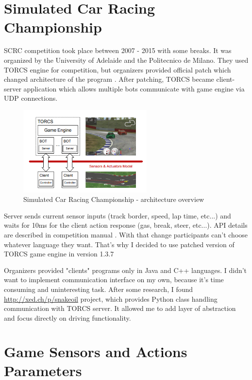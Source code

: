 \documentclass[declaration,shortabstract,english,inz]{iithesis}
\begin{document}
\section{Simulated Car Racing Championship}

SCRC competition took place between 2007 - 2015 with some breaks. It was organized by the University of Adelaide and the Politecnico de Milano.
They used TORCS engine for competition, but organizers provided official patch which changed architecture of the program \cite{SCRC}.
After patching, TORCS became client-server application which allows multiple bots communicate with game engine via UDP connections. 

\begin{figure}
    \includegraphics[width=0.6\textwidth]{img/scr_architecture.png}
    \caption{Simulated Car Racing Championship - architecture overview \cite{scrc_manual}}
    \label{fig:scrc_arc}
\end{figure}

Server sends current sensor inputs (track border, speed, lap time, etc...) and waits for 10ms for the client action response (gas, break, steer, etc...).
 API details are described in competition manual \cite{scrc_manual}.
 With that change participants can't choose whatever language they want.
 That's why I decided to use patched version of TORCS game engine in version 1.3.7

Organizers provided "clients" programs only in Java and C++ languages.
I didn't want to implement communication interface on my own, because it's time consuming  and uninteresting task.
After some research, I found \url{http://xed.ch/p/snakeoil} project, which provides Python class handling communication with TORCS server.
It allowed me to add layer of abstraction and focus directly on driving functionality.

\section{Game Sensors and Actions Parameters}
    
\end{document}
